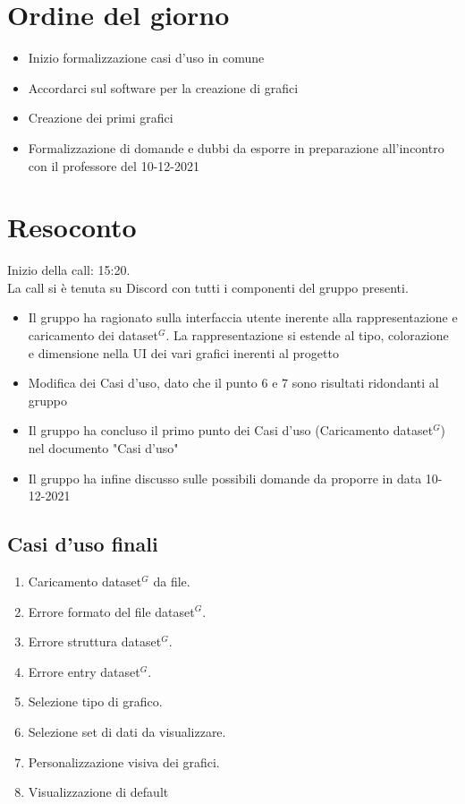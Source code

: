 \section{Ordine del giorno}

\begin{itemize}
	\item Inizio formalizzazione casi d'uso in comune
	\item Accordarci sul software per la creazione di grafici
	\item Creazione dei primi grafici
	\item Formalizzazione di domande e dubbi da esporre in preparazione all'incontro con il professore del 10-12-2021
\end{itemize}

\section{Resoconto}

\noindent 
Inizio della call: 15:20. \\
\noindent La call si è tenuta su Discord con tutti i componenti del gruppo presenti.
\begin{itemize}
	\item Il gruppo ha ragionato sulla interfaccia utente inerente alla rappresentazione e caricamento dei dataset$^{G}$. La rappresentazione si estende al tipo, colorazione e dimensione nella UI dei vari grafici inerenti al progetto
	\item Modifica dei Casi d'uso, dato che il punto 6 e 7 sono risultati ridondanti al gruppo
	\item Il gruppo ha concluso il primo punto dei Casi d'uso (Caricamento dataset$^{G}$) nel documento "Casi d'uso"
	\item Il gruppo ha infine discusso sulle possibili domande da proporre in data 10-12-2021
\end{itemize}

\subsection{Casi d'uso finali}
\begin{enumerate}
	\item Caricamento dataset$^{G}$ da file.
	\item Errore formato del file dataset$^{G}$.
	\item Errore struttura dataset$^{G}$.
	\item Errore entry dataset$^{G}$.
	\item Selezione tipo di grafico.
	\item Selezione set di dati da visualizzare.
	\item Personalizzazione visiva dei grafici.
	\item Visualizzazione di default
\end{enumerate}

